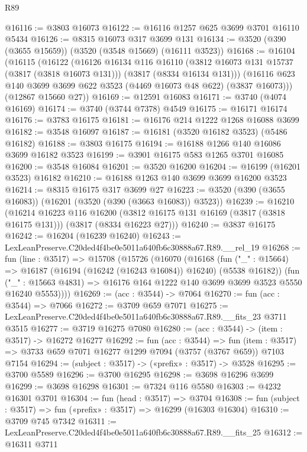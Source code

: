 \begin{lexlean}{R89}
\begin{coremodule}
@16116 := @3803 @16073
@16122 := @16116 @1257 @625 @3699 @3701 @16110 @5434
@16126 := @8315 @16073 @317 @3699 @131
@16134 := @3520 (@390 (@3655 @15659)) (@3520 (@3548 @15669) (@16111 @3523))
@16168 := @16104
    (@16115
      (@16122
        (@16126
          @16134
          @116
          @16110
          (@3812 @16073 @131 @15737 (@3817 (@3818 @16073 @131)))
          (@3817 (@8334 @16134 @131)))
        (@16116 @623 @140 @3699 @3699 @622 @3523 (@4469 @16073 @48 @622) (@3837 @16073)))
      (@12867 @15660 @27))
@16169 := @12591 @16083
@16171 := @3740 (@4074 @16169)
@16174 := @3740 (@3744 @7378) @4549
@16175 := @16171 @16174
@16176 := @3783 @16175
@16181 := @16176 @214 @1222 @1268 @16088 @3699
@16182 := @3548 @16097
@16187 := @16181 (@3520 @16182 @3523) (@5486 @16182)
@16188 := @3803 @16175
@16194 := @16188 @1266 @140 @16086 @3699 @16182 @3523
@16199 := @3901 @16175 @583 @1265 @3701 @16085
@16200 := @3548 @16084
@16201 := @3520 @16200
@16204 := @16199 (@16201 @3523) @16182
@16210 := @16188 @1263 @140 @3699 @3699 @16200 @3523
@16214 := @8315 @16175 @317 @3699 @27
@16223 := @3520 (@390 (@3655 @16083)) (@16201 (@3520 (@390 (@3663 @16083)) @3523))
@16239 := @16210
    (@16214
      @16223
      @116
      @16200
      (@3812 @16175 @131 @16169 (@3817 (@3818 @16175 @131)))
      (@3817 (@8334 @16223 @27)))
@16240 := @3837 @16175
@16242 := @16204 (@16239 @16240)
@16243 := LexLeanPreserve.C20ded4f4be0e5011a640fb6c30888a67.R89.__rel_19
@16268 := fun (line : @3517) =>
  @15708
    (@15726
      (@16070
        (@16168
          (fun ("_" : @15664) => @16187 (@16194 (@16242 (@16243 @16084)) @16240) (@5538 @16182))
          (fun ("_" : @15663 @4831) =>
          @16176 @164 @1222 @140 @3699 @3699 @3523 @5550 @16240 @5553))))
@16269 := (acc : @3544) -> @7064
@16270 := fun (acc : @3544) => @7066
@16272 := @3709 @659 @7071
@16275 := LexLeanPreserve.C20ded4f4be0e5011a640fb6c30888a67.R89.__fits_23 @3711 @3515
@16277 := @3719 @16275 @7080
@16280 := (acc : @3544) -> (item : @3517) -> @16272 @16277
@16292 := fun (acc : @3544) =>
  fun (item : @3517) => @3733 @659 @7071 @16277 @1299 @7094 (@3757 (@3767 @659)) @7103 @7154
@16294 := (subject : @3517) -> («prefix» : @3517) -> @3528
@16295 := @3700 @5589
@16296 := @3700 @16295
@16298 := @3698 @16296 @3699
@16299 := @3698 @16298
@16301 := @7324 @116 @5580
@16303 := @4232 @16301 @3701
@16304 := fun (head : @3517) => @3704
@16308 := fun (subject : @3517) => fun («prefix» : @3517) => @16299 (@16303 @16304)
@16310 := @3709 @745 @7342
@16311 := LexLeanPreserve.C20ded4f4be0e5011a640fb6c30888a67.R89.__fits_25
@16312 := @16311 @3711

\end{coremodule}
\end{lexlean}
